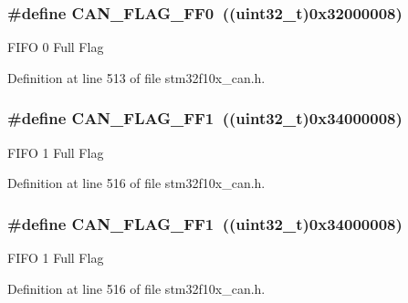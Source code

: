 \subsubsection[{\texorpdfstring{C\+A\+N\+\_\+\+F\+L\+A\+G\+\_\+\+F\+F0}{CAN_FLAG_FF0}}]{\setlength{\rightskip}{0pt plus 5cm}\#define C\+A\+N\+\_\+\+F\+L\+A\+G\+\_\+\+F\+F0~(({\bf uint32\+\_\+t})0x32000008)}\hypertarget{group___c_a_n__flags_ga11648741ff43af1561ce7009698fb797}{}\label{group___c_a_n__flags_ga11648741ff43af1561ce7009698fb797}
F\+I\+FO 0 Full Flag 

Definition at line 513 of file stm32f10x\+\_\+can.\+h.

\subsubsection[{\texorpdfstring{C\+A\+N\+\_\+\+F\+L\+A\+G\+\_\+\+F\+F1}{CAN_FLAG_FF1}}]{\setlength{\rightskip}{0pt plus 5cm}\#define C\+A\+N\+\_\+\+F\+L\+A\+G\+\_\+\+F\+F1~(({\bf uint32\+\_\+t})0x34000008)}\hypertarget{group___c_a_n__flags_ga0fa967743c5db04189bb2160aa48e371}{}\label{group___c_a_n__flags_ga0fa967743c5db04189bb2160aa48e371}
F\+I\+FO 1 Full Flag 

Definition at line 516 of file stm32f10x\+\_\+can.\+h.

\subsubsection[{\texorpdfstring{C\+A\+N\+\_\+\+F\+L\+A\+G\+\_\+\+F\+F1}{CAN_FLAG_FF1}}]{\setlength{\rightskip}{0pt plus 5cm}\#define C\+A\+N\+\_\+\+F\+L\+A\+G\+\_\+\+F\+F1~(({\bf uint32\+\_\+t})0x34000008)}\hypertarget{group___c_a_n__flags_ga0fa967743c5db04189bb2160aa48e371}{}\label{group___c_a_n__flags_ga0fa967743c5db04189bb2160aa48e371}
F\+I\+FO 1 Full Flag 

Definition at line 516 of file stm32f10x\+\_\+can.\+h.

